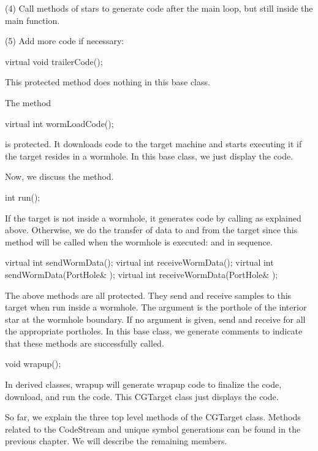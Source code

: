 (4) Call  methods of stars to generate code after the main
loop, but still inside the main function.

(5) Add more code if necessary: 

\begin{example}
virtual void trailerCode();
\end{example}

This protected method does nothing in this base class.

The method

\begin{example}
virtual int wormLoadCode();
\end{example}

is protected. It downloads code to the target machine
and starts executing it if the target resides in a wormhole. In this
base class, we just display the code.

Now, we discuss the  method.

\begin{example}
int run();
\end{example}

If the target is not inside a wormhole, it generates code by calling
 as explained above. Otherwise, we do the transfer of
data to and from the target since this method will be called when the
wormhole is executed:  and 
in sequence.

\begin{example}
virtual int sendWormData();
virtual int receiveWormData();
virtual int sendWormData(PortHole& );
virtual int receiveWormData(PortHole& );
\end{example}

The above methods are all protected. They send and receive samples to this
target when run inside a wormhole. The argument is the porthole of the
interior star at the wormhole boundary. If no argument is given, send and
receive for all the appropriate portholes. In this base class, we generate
comments to indicate that these methods are successfully called.

\begin{example}
void wrapup();
\end{example}

In derived classes, wrapup will generate wrapup code to finalize the code,
download, and run the code. This CGTarget class just displays the code.

So far, we explain the three top level methods of the CGTarget class.
Methods related to the CodeStream and unique symbol generations can
be found in the previous chapter. We will describe the remaining members.

